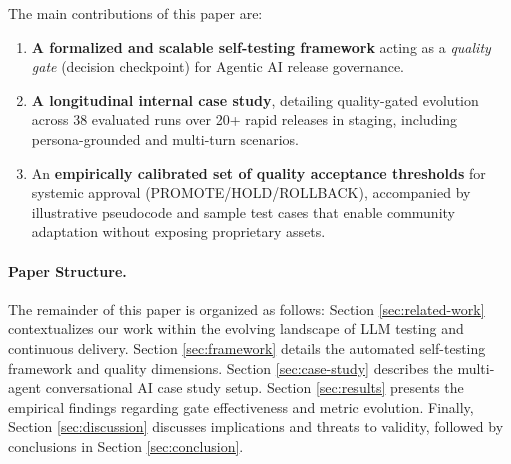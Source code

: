 The main contributions of this paper are:
\begin{enumerate}
    \item \textbf{A formalized and scalable self-testing framework} acting as a \textit{quality gate} (decision checkpoint) for Agentic AI release governance.
    \item \textbf{A longitudinal internal case study}, detailing quality-gated evolution across 38 evaluated runs over 20+ rapid releases in staging, including persona-grounded and multi-turn scenarios.
    \item An \textbf{empirically calibrated set of quality acceptance thresholds} for systemic approval (PROMOTE/HOLD/ROLLBACK), accompanied by illustrative pseudocode and sample test cases that enable community adaptation without exposing proprietary assets.
\end{enumerate}

\paragraph{Paper Structure.} The remainder of this paper is organized as follows: Section \ref{sec:related-work} contextualizes our work within the evolving landscape of LLM testing and continuous delivery. Section \ref{sec:framework} details the automated self-testing framework and quality dimensions. Section \ref{sec:case-study} describes the multi-agent conversational AI case study setup. Section \ref{sec:results} presents the empirical findings regarding gate effectiveness and metric evolution. Finally, Section \ref{sec:discussion} discusses implications and threats to validity, followed by conclusions in Section \ref{sec:conclusion}.

